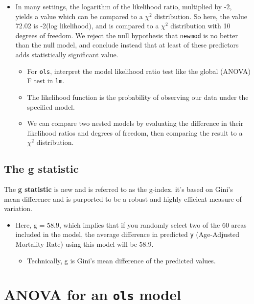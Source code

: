 \documentclass[]{book}
\providecommand{\tightlist}{%
  \setlength{\itemsep}{0pt}\setlength{\parskip}{0pt}}
\theoremstyle{definition}
\theoremstyle{definition}
\theoremstyle{definition}
\theoremstyle{remark}
\begin{document}
\begin{itemize}
\tightlist
\item
  In many settings, the logarithm of the likelihood ratio, multiplied by
  -2, yields a value which can be compared to a \(\chi^2\) distribution.
  So here, the value 72.02 is -2(log likelihood), and is compared to a
  \(\chi^2\) distribution with 10 degrees of freedom. We reject the null
  hypothesis that \texttt{newmod} is no better than the null model, and
  conclude instead that at least of these predictors adds statistically
  significant value.

  \begin{itemize}
  \tightlist
  \item
    For \texttt{ols}, interpret the model likelihood ratio test like the
    global (ANOVA) F test in \texttt{lm}.
  \item
    The likelihood function is the probability of observing our data
    under the specified model.
  \item
    We can compare two nested models by evaluating the difference in
    their likelihood ratios and degrees of freedom, then comparing the
    result to a \(\chi^2\) distribution.
  \end{itemize}
\end{itemize}

\subsection{The g statistic}\label{the-g-statistic}

The \textbf{g statistic} is new and is referred to as the g-index. it's
based on Gini's mean difference and is purported to be a robust and
highly efficient measure of variation.

\begin{itemize}
\tightlist
\item
  Here, g = 58.9, which implies that if you randomly select two of the
  60 areas included in the model, the average difference in predicted
  \texttt{y} (Age-Adjusted Mortality Rate) using this model will be
  58.9.

  \begin{itemize}
  \tightlist
  \item
    Technically, g is Gini's mean difference of the predicted values.
  \end{itemize}
\end{itemize}

\section{\texorpdfstring{ANOVA for an \texttt{ols}
model}{ANOVA for an ols model}}\label{anova-for-an-ols-model}
\end{document}
